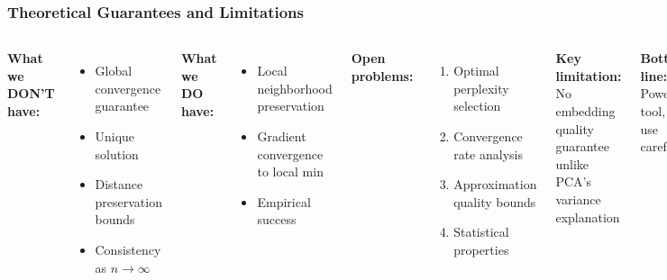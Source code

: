\documentclass[aspectratio=169]{beamer}
\begin{document}
\begin{frame}
\frametitle{Theoretical Guarantees and Limitations}
\begin{columns}[T]
\textbf{What we DON'T have:}
\begin{itemize}
\small
\item Global convergence guarantee
\item Unique solution
\item Distance preservation bounds
\item Consistency as $n \to \infty$
\end{itemize}

\vspace{0.3cm}
\textbf{What we DO have:}
\begin{itemize}
\small
\item Local neighborhood preservation
\item Gradient convergence to local min
\item Empirical success
\end{itemize}

\textbf{Open problems:}
\begin{enumerate}
\small
\item Optimal perplexity selection
\item Convergence rate analysis  
\item Approximation quality bounds
\item Statistical properties
\end{enumerate}

\vspace{0.3cm}
\textbf{Key limitation:}\\
\small No embedding quality guarantee\\
unlike PCA's variance explanation

\vspace{0.3cm}
\textbf{Bottom line:}\\
\small Powerful tool, but use carefully
\end{columns}
\end{frame}
\end{document}
